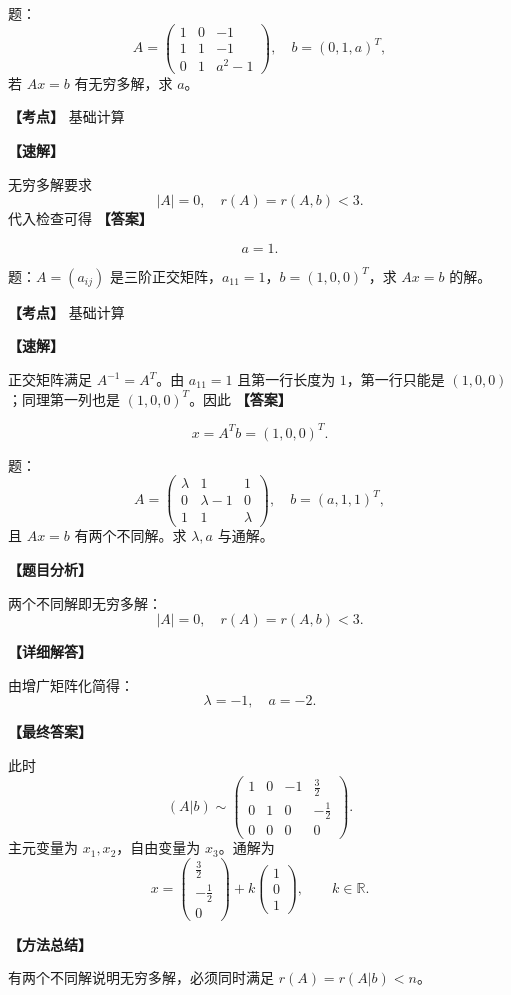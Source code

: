 ﻿\documentclass[11pt,a4paper,UTF8]{ctexart}
\begin{document}
\begin{answerbox}[2023--2024 填空 3]
题：
\[A=\begin{pmatrix}1&0&-1\\1&1&-1\\0&1&a^2-1\end{pmatrix},\quad b=(0,1,a)^T,\]
若 $Ax=b$ 有无穷多解，求 $a$。

\textbf{【考点】} 基础计算

\textbf{【速解】}

无穷多解要求
\[|A|=0,\quad r(A)=r(A,b)<3.\]
代入检查可得
\textbf{【答案】}

\[a=1.\]
\end{answerbox}
\begin{answerbox}[2023--2024 填空 4]
题：$A=(a_{ij})$ 是三阶正交矩阵，$a_{11}=1$，$b=(1,0,0)^T$，求 $Ax=b$ 的解。

\textbf{【考点】} 基础计算

\textbf{【速解】}

正交矩阵满足 $A^{-1}=A^T$。由 $a_{11}=1$ 且第一行长度为 $1$，第一行只能是 $(1,0,0)$；同理第一列也是 $(1,0,0)^T$。因此
\textbf{【答案】}

\[
x=A^Tb=(1,0,0)^T.
\]
\end{answerbox}
\begin{answerbox}[2023--2024 解答四]
题：
\[
A=\begin{pmatrix}\lambda&1&1\\0&\lambda-1&0\\1&1&\lambda\end{pmatrix},\quad
b=(a,1,1)^T,
\]
且 $Ax=b$ 有两个不同解。求 $\lambda,a$ 与通解。

\textbf{【题目分析】}

两个不同解即无穷多解：
\[|A|=0,\quad r(A)=r(A,b)<3.\]

\textbf{【详细解答】}

由增广矩阵化简得：
\[\lambda=-1,\quad a=-2.\]

\textbf{【最终答案】}

此时
\[
(A|b)\sim
\begin{pmatrix}
1&0&-1&\frac32\\
0&1&0&-\frac12\\
0&0&0&0
\end{pmatrix}.
\]
主元变量为 \(x_1,x_2\)，自由变量为 \(x_3\)。通解为
\[
x=
\begin{pmatrix}
\frac32\\[0.2em]
-\frac12\\[0.2em]
0
\end{pmatrix}
+k
\begin{pmatrix}
1\\0\\1
\end{pmatrix},
\qquad k\in\mathbb R.
\]

\textbf{【方法总结】}

有两个不同解说明无穷多解，必须同时满足 \(r(A)=r(A|b)<n\)。
\end{answerbox}
\end{document}
